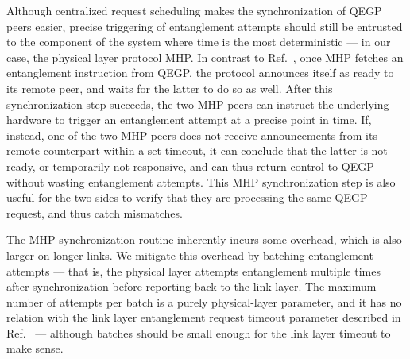 Although centralized request scheduling makes the synchronization of QEGP peers easier, precise
triggering of entanglement attempts should still be entrusted to the component of the system where
time is the most deterministic --- in our case, the physical layer protocol MHP. In contrast to
Ref.~\cite{dahlberg_2019_egp}, once MHP fetches an entanglement instruction from QEGP, the protocol
announces itself as ready to its remote peer, and waits for the latter to do so as well. After this
synchronization step succeeds, the two MHP peers can instruct the underlying hardware to trigger an
entanglement attempt at a precise point in time. If, instead, one of the two MHP peers does not
receive announcements from its remote counterpart within a set timeout, it can conclude that the
latter is not ready, or temporarily not responsive, and can thus return control to QEGP without
wasting entanglement attempts. This MHP synchronization step is also useful for the two sides to
verify that they are processing the same QEGP request, and thus catch mismatches.

The MHP synchronization routine inherently incurs some overhead, which is also larger on longer
links. We mitigate this overhead by batching entanglement attempts --- that is, the physical layer
attempts entanglement multiple times after synchronization before reporting back to the link layer.
The maximum number of attempts per batch is a purely physical-layer parameter, and it has no
relation with the link layer entanglement request timeout parameter described in
Ref.~\cite{dahlberg_2019_egp} --- although batches should be small enough for the link layer timeout
to make sense.


